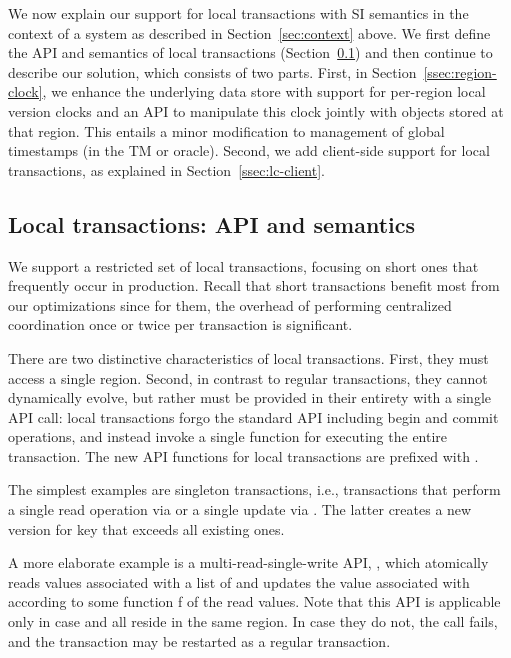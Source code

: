 

We now explain our support for local transactions with SI semantics in the
context of a system as described in Section~\ref{sec:context} above. We first define the API and
semantics of local transactions (Section~\ref{ssec:lc-api}) and then continue to describe our
solution, which consists of two parts. First, in Section~\ref{ssec:region-clock}, we enhance the
underlying data store with support for per-region local version clocks and an
API to manipulate this clock jointly with objects stored at that region. This
entails a minor modification to management of global timestamps (in the TM or oracle). 
Second, we add client-side support for local transactions, as explained in Section~\ref{ssec:lc-client}.

\subsection{Local transactions: API and semantics} \label{ssec:lc-api}

We support a restricted set of local transactions, focusing on short ones that
frequently occur in production. Recall that short transactions benefit most from
our optimizations since for them, the overhead of performing centralized coordination once or twice
per transaction is significant.

There are two distinctive characteristics of local transactions. First, they
must access a single region. Second, in contrast to regular transactions, they
cannot dynamically evolve, but rather must be provided in their entirety with a
single API call: 
local transactions forgo the standard API including begin and commit operations,
and instead invoke a single function for executing the entire transaction. The
new API functions for local transactions are prefixed with . 

The simplest examples are singleton transactions, i.e., transactions that perform a single
read operation via  or a single update via . 
The latter creates a new version for key that exceeds all existing ones.

A more elaborate example is a multi-read-single-write API, , 
which atomically reads values associated  with a list of \rkeys and updates the value associated with
\wkey according to some function f of the read values. Note that this API
is applicable only in case \wkey and all \rkeys reside in the same region. In case
they do not, the call fails, and the transaction may be restarted as a regular
transaction.

